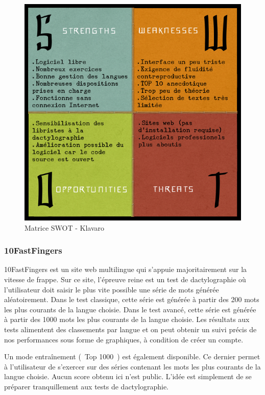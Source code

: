 \documentclass[a4paper,12pt]{article}
\begin{document}
\begin{figure}[!h]
\begin{center}
\includegraphics[scale=0.5]{swot-klavaro.png}
\end{center}
\caption{Matrice SWOT - Klavaro}
\end{figure}

\newpage

\subsubsection{10FastFingers}

10FastFingers est un site web multilingue qui s'appuie majoritairement sur la vitesse de frappe. Sur ce site, l'épreuve reine est un test de dactylographie où l'utilisateur doit saisir le plus vite possible une série de mots générée aléatoirement. Dans le test classique, cette série est générée à partir des 200 mots les plus courants de la langue choisie. Dans le test avancé, cette série est générée à partir des 1000 mots les plus courants de la langue choisie. Les résultats aux tests alimentent des classements par langue et on peut obtenir un suivi précis de nos performances sous forme de graphiques, à condition de créer un compte.

Un mode entraînement (\og~Top 1000~\fg) est également disponible. Ce dernier permet à l'utilisateur de s'exercer sur des séries contenant les mots les plus courants de la langue choisie. Aucun score obtenu ici n'est public. L'idée est simplement de se préparer tranquillement aux tests de dactylographie.
\end{document}
